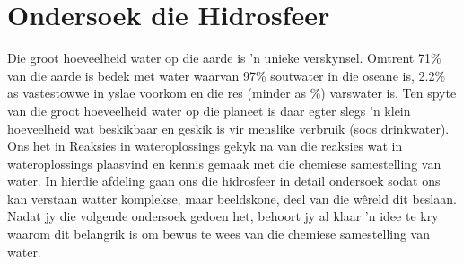 \section{Ondersoek die Hidrosfeer}
            \nopagebreak

Die groot hoeveelheid water op die aarde is  'n unieke verskynsel. Omtrent 71\% van die aarde is bedek met water waarvan 97\% soutwater in die oseane is, 2.2\% as vastestowwe in yslae voorkom en die res (minder as \%) varswater is. Ten spyte van die groot hoeveelheid water op die planeet is daar egter slegs  'n klein hoeveelheid wat beskikbaar en geskik is vir menslike verbruik (soos drinkwater). 
Ons het in Reaksies in wateroplossings gekyk na van die reaksies wat in wateroplossings plaasvind en kennis gemaak met die chemiese samestelling van water. In hierdie afdeling gaan ons die hidrosfeer in detail ondersoek sodat ons kan verstaan watter komplekse, maar beeldskone, deel van die wêreld dit beslaan. Nadat jy die volgende ondersoek gedoen het, behoort jy al klaar  'n idee te kry waarom dit belangrik is om bewus te wees van die chemiese samestelling van water.
\label{m38138*secfhsst!!!underscore!!!id86}
